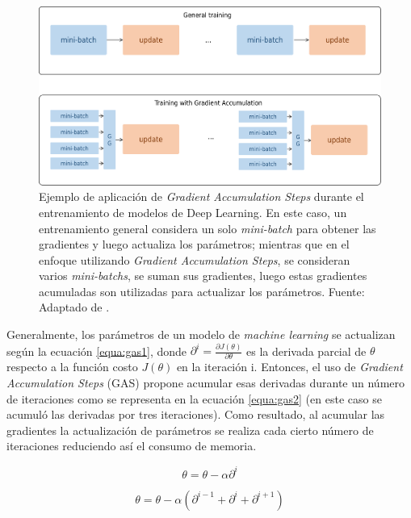 \begin{figure}[H]
	\centering
	\includegraphics[width=\textwidth]{../img/proposal/gas_own}	
	\caption[Ejemplo de aplicación de \textit{Gradient Accumulation Steps}]{Ejemplo de aplicación de \textit{Gradient Accumulation Steps} durante el entrenamiento de modelos de Deep Learning. En este caso, un entrenamiento general considera un solo \textit{mini-batch} para obtener las gradientes y luego actualiza los parámetros; mientras que en el enfoque utilizando \textit{Gradient Accumulation Steps}, se consideran varios \textit{mini-batchs}, se suman sus gradientes, luego estas gradientes acumuladas son utilizadas para actualizar los parámetros.  Fuente: Adaptado de  \cite{prince2023understanding}.}		
	\label{fig:gas_example}
\end{figure}

Generalmente, los parámetros de un modelo de \textit{machine learning} se actualizan según la ecuación \ref{equa:gas1}, donde $ \partial^i = \frac{\partial J(\theta)}{\partial \theta}   $ es la derivada parcial de $\theta$ respecto a la función costo $J(\theta)$ en la iteración i. Entonces, el uso de \textit{Gradient Accumulation Steps} (GAS) propone acumular esas derivadas durante un número de iteraciones como se representa en la ecuación \ref{equa:gas2} (en este caso se acumuló las derivadas por tres iteraciones). Como resultado, al acumular las gradientes la actualización de parámetros se realiza cada cierto número de iteraciones reduciendo así el consumo de memoria. 

\begin{equation}\label{equa:gas1}
	\theta = \theta - \alpha \partial^{i}
\end{equation}

\begin{equation}\label{equa:gas2}
	\theta = \theta - \alpha (\partial^{i-1} + \partial^{i} + \partial^{i+1})
\end{equation}



